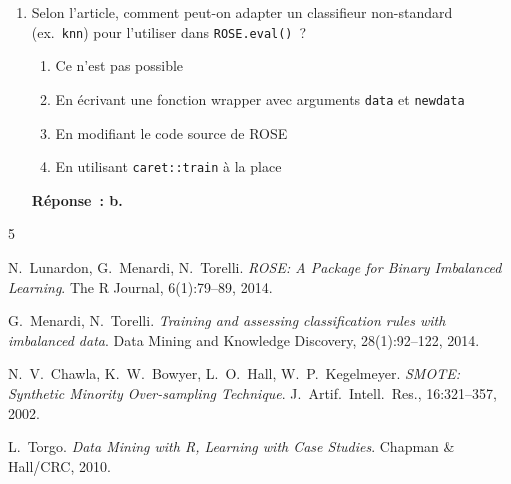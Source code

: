 \documentclass[a4paper,11pt]{article}
\theoremstyle{definition}
\begin{document}
\begin{enumerate}
  \item Selon l'article, comment peut-on adapter un classifieur
    non-standard (ex.~\texttt{knn}) pour l'utiliser dans
    \texttt{ROSE.eval()}~?
    \begin{enumerate}
      \item Ce n'est pas possible
      \item En \'ecrivant une fonction wrapper avec arguments
        \texttt{data} et \texttt{newdata}
      \item En modifiant le code source de ROSE
      \item En utilisant \texttt{caret::train} \`a la place
    \end{enumerate}
    \textbf{R\'eponse~: b.}

\end{enumerate}

\begin{thebibliography}{5}

  N.~Lunardon, G.~Menardi, N.~Torelli.
  \newblock \emph{ROSE: A Package for Binary Imbalanced Learning}.
  \newblock The R Journal, 6(1):79--89, 2014.

  G.~Menardi, N.~Torelli.
  \newblock \emph{Training and assessing classification rules with
    imbalanced data}.
  \newblock Data Mining and Knowledge Discovery, 28(1):92--122, 2014.

  N.~V.~Chawla, K.~W.~Bowyer, L.~O.~Hall, W.~P.~Kegelmeyer.
  \newblock \emph{SMOTE: Synthetic Minority Over-sampling Technique}.
  \newblock J.~Artif.~Intell.~Res., 16:321--357, 2002.

  L.~Torgo.
  \newblock \emph{Data Mining with R, Learning with Case Studies}.
  \newblock Chapman \& Hall/CRC, 2010.

\end{thebibliography}
\end{document}
